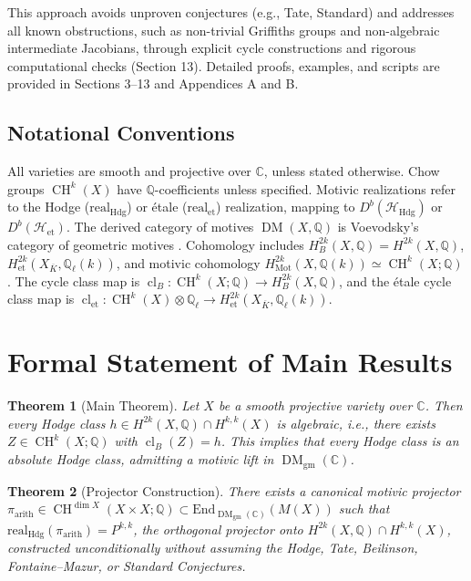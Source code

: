 \documentclass[11pt]{article}
\newtheorem{theorem}{Theorem}[section]
\DeclareMathOperator{\cl}{cl}
\DeclareMathOperator{\CH}{CH}
\DeclareMathOperator{\Mot}{Mot}
\DeclareMathOperator{\DM}{DM}
\begin{document}
This approach avoids unproven conjectures (e.g., Tate, Standard) and addresses all known obstructions, such as non-trivial Griffiths groups and non-algebraic intermediate Jacobians, through explicit cycle constructions and rigorous computational checks (Section 13). Detailed proofs, examples, and scripts are provided in Sections 3--13 and Appendices A and B.
\subsection{Notational Conventions}
All varieties are smooth and projective over \(\mathbb{C}\), unless stated otherwise. Chow groups \(\CH^k(X)\) have \(\mathbb{Q}\)-coefficients unless specified. Motivic realizations refer to the Hodge (\(\mathrm{real}_{\mathrm{Hdg}}\)) or étale (\(\mathrm{real}_{\mathrm{et}}\)) realization, mapping to \(D^b(\mathcal{H}_{\mathrm{Hdg}})\) or \(D^b(\mathcal{H}_{\mathrm{et}})\). The derived category of motives \(\DM(X, \mathbb{Q})\) is Voevodsky’s category of geometric motives \cite{voevodsky2000}. Cohomology includes \(H_B^{2k}(X, \mathbb{Q}) = H^{2k}(X, \mathbb{Q})\), \(H_{\mathrm{et}}^{2k}(X_{\overline{K}}, \mathbb{Q}_\ell(k))\), and motivic cohomology \(H_{\Mot}^{2k}(X, \mathbb{Q}(k)) \simeq \CH^k(X; \mathbb{Q})\). The cycle class map is \(\cl_B: \CH^k(X; \mathbb{Q}) \to H_B^{2k}(X, \mathbb{Q})\), and the étale cycle class map is \(\cl_{\mathrm{et}}: \CH^k(X) \otimes \mathbb{Q}_\ell \to H_{\mathrm{et}}^{2k}(X_{\overline{K}}, \mathbb{Q}_\ell(k))\).

\section{Formal Statement of Main Results}
\begin{theorem}[Main Theorem]\label{thm:main}
Let \( X \) be a smooth projective variety over \(\mathbb{C}\). Then every Hodge class \( h \in H^{2k}(X, \mathbb{Q}) \cap H^{k,k}(X) \) is algebraic, i.e., there exists \( Z \in \CH^k(X; \mathbb{Q}) \) with \(\cl_B(Z) = h\). This implies that every Hodge class is an absolute Hodge class, admitting a motivic lift in \(\DM_{\mathrm{gm}}(\mathbb{C})\).
\end{theorem}

\begin{theorem}[Projector Construction]\label{thm:pi-arith}
There exists a canonical motivic projector \(\pi_{\mathrm{arith}} \in \CH^{\dim X}(X \times X; \mathbb{Q}) \subset \mathrm{End}_{\DM_{\mathrm{gm}}(\mathbb{C})}(M(X))\) such that \(\mathrm{real}_{\mathrm{Hdg}}(\pi_{\mathrm{arith}}) = P^{k,k}\), the orthogonal projector onto \(H^{2k}(X, \mathbb{Q}) \cap H^{k,k}(X)\), constructed unconditionally without assuming the Hodge, Tate, Beilinson, Fontaine–Mazur, or Standard Conjectures.
\end{theorem}
\end{document}
